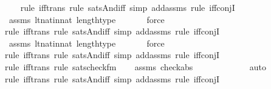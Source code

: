 \begin{isabellebody}
\ \ \ \isamarkupfalse%
{\isacharparenleft}{\kern0pt}rule\ iff{\isacharunderscore}{\kern0pt}trans{\isacharcomma}{\kern0pt}\ rule\ sats{\isacharunderscore}{\kern0pt}And{\isacharunderscore}{\kern0pt}iff{\isacharcomma}{\kern0pt}\ simp\ add{\isacharcolon}{\kern0pt}assms{\isacharcomma}{\kern0pt}\ rule\ iff{\isacharunderscore}{\kern0pt}conjI{}{\isacharparenright}{\kern0pt}\isanewline
\ \ \isamarkupfalse%
\ assms\ lt{\isacharunderscore}{\kern0pt}nat{\isacharunderscore}{\kern0pt}in{\isacharunderscore}{\kern0pt}nat\ length{\isacharunderscore}{\kern0pt}type\ \isanewline
\ \ \ \ \isamarkupfalse%
\ force\isanewline
\ \ \ \isamarkupfalse%
{\isacharparenleft}{\kern0pt}rule\ iff{\isacharunderscore}{\kern0pt}trans{\isacharcomma}{\kern0pt}\ rule\ sats{\isacharunderscore}{\kern0pt}And{\isacharunderscore}{\kern0pt}iff{\isacharcomma}{\kern0pt}\ simp\ add{\isacharcolon}{\kern0pt}assms{\isacharcomma}{\kern0pt}\ rule\ iff{\isacharunderscore}{\kern0pt}conjI{}{\isacharparenright}{\kern0pt}\isanewline
\ \ \isamarkupfalse%
\ assms\ lt{\isacharunderscore}{\kern0pt}nat{\isacharunderscore}{\kern0pt}in{\isacharunderscore}{\kern0pt}nat\ length{\isacharunderscore}{\kern0pt}type\ \isanewline
\ \ \ \ \isamarkupfalse%
\ force\isanewline
\ \ \ \isamarkupfalse%
{\isacharparenleft}{\kern0pt}rule\ iff{\isacharunderscore}{\kern0pt}trans{\isacharcomma}{\kern0pt}\ rule\ sats{\isacharunderscore}{\kern0pt}And{\isacharunderscore}{\kern0pt}iff{\isacharcomma}{\kern0pt}\ simp\ add{\isacharcolon}{\kern0pt}assms{\isacharcomma}{\kern0pt}\ rule\ iff{\isacharunderscore}{\kern0pt}conjI{}{\isacharparenright}{\kern0pt}\isanewline
\ \ \ \ \isamarkupfalse%
{\isacharparenleft}{\kern0pt}rule\ iff{\isacharunderscore}{\kern0pt}trans{\isacharcomma}{\kern0pt}\ rule\ sats{\isacharunderscore}{\kern0pt}check{\isacharunderscore}{\kern0pt}fm{\isacharparenright}{\kern0pt}\isanewline
\ \ \isamarkupfalse%
\ assms\ check{\isacharunderscore}{\kern0pt}abs\isanewline
\ \ \ \ \ \ \ \ \ \ \ \isamarkupfalse%
\ auto{\isacharbrackleft}{\kern0pt}{}{\isacharbrackright}{\kern0pt}\isanewline
\ \ \ \isamarkupfalse%
{\isacharparenleft}{\kern0pt}rule\ iff{\isacharunderscore}{\kern0pt}trans{\isacharcomma}{\kern0pt}\ rule\ sats{\isacharunderscore}{\kern0pt}And{\isacharunderscore}{\kern0pt}iff{\isacharcomma}{\kern0pt}\ simp\ add{\isacharcolon}{\kern0pt}assms{\isacharcomma}{\kern0pt}\ rule\ iff{\isacharunderscore}{\kern0pt}conjI{}{\isacharparenright}{\kern0pt}\isanewline

\end{isabellebody}
